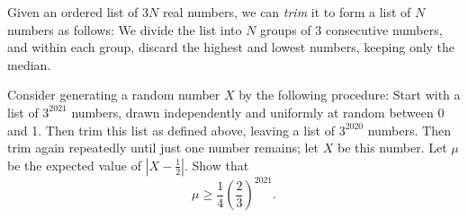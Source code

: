 Given an ordered list of $3N$ real numbers, we can \emph{trim} it to form a list of $N$ numbers as follows: We divide the list into $N$ groups of $3$ consecutive numbers, and within each group, discard the highest and lowest numbers, keeping only the median.

Consider generating a random number $X$ by the following procedure: Start with a list of $3^{2021}$ numbers, drawn independently and uniformly at random between 0 and 1. Then trim this list as defined above, leaving a list of $3^{2020}$ numbers. Then trim again repeatedly until just one number remains; let $X$ be this number. Let $\mu$ be the expected value of $|X - \frac{1}{2}|$. Show that
\[
\mu \geq \frac{1}{4} \left( \frac{2}{3} \right)^{2021}.
\]
